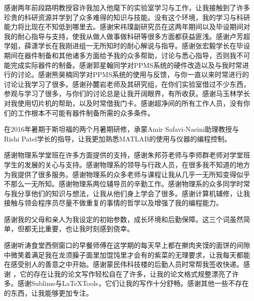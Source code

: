 
\begin{acknowledgement}
  感谢两年前段路明教授容许我加入他麾下的实验室学习与工作，让我接触到了许多珍贵的科研资源并学到了众多难得的知识与技能。没有这个环境，我的学习与科研能力将比现在不知低到哪里去。感谢宋祎璞副研究员在这两年期间以及毕设期间对我的耐心指导与支持，使我从做人做事做科研等很多方面都获益匪浅。感谢卢芳超学姐，薛潇学长在我刚进组一无所知时的耐心解说与指导。感谢张宏毅学长在毕设期间在器件制备和其他诸多方面给予我的众多帮助，讨论与悉心指导，否则我不可能完成实际器件的制备。感谢郭星翰同学对PPMS系统的硬件改造以及与我时常进行的讨论。感谢熊昊楠同学对PPMS系统的使用与反馈，与你一直以来时常进行的讨论让我学习了很多。感谢孙麓岩老师及其研究组，在你们实验室借过不少东西，参观与学习了很多，与你们的讨论总是让我开阔眼界，有所收获。感谢马玉林学长对我使用切片机的帮助，以及时常借我门卡。感谢超净间的所有工作人员，没有你们的工作根本不可能有器件制备所需的众多条件。

  在2016年暑期于斯坦福的两个月暑期研修，承蒙Amir Safavi-Naeini助理教授与Rishi Patel学长的指导，让我更加熟悉MATLAB的使用与仪器的编程控制。

  感谢物理系学堂班在许多方面提供的支持，感谢朱邦芬老师与李师群老师对学堂班学生的发展的关心与支持。感谢物理系的领导与行政人员，在很多我不知道的地方为我提供了很多服务。感谢物理系的众多老师与课程让我从几乎一无所知变得似乎不那么一无所知。感谢物理系两位辅导员的辛勤工作。感谢物理系的众多同学时常与我分享他们的知识与想法，让我从他们身上学会了很多。感谢计算机辅修，让我接触与领会程序员尽量不做重复的事情的哲学以及增强了我的编程能力。

  感谢我的父母和亲人为我设定的初始参数，成长环境和后勤保障。这三个词虽然简单，但都无比重要，也让我时刻感到侥幸。

  感谢听涛食堂西侧窗口的早餐师傅在这学期的每天早上都在擀肉夹馍的面饼的间隙中微笑着满足我在龙须臊子面里加馄饨里才会有的紫菜的无理要求，让我每天都能在感受别人的善意之中开始。感谢蒙民伟科技楼的后勤人员时常帮我签收快递。感谢 \thuthesis，它的存在让我的论文写作轻松自在了许多，让我的论文格式规整漂亮了许多。感谢Sublime与LaTeXTools，它们让我的写作十分舒畅。感谢其他一些不存在的东西，让我能够更加专注。

\end{acknowledgement}
